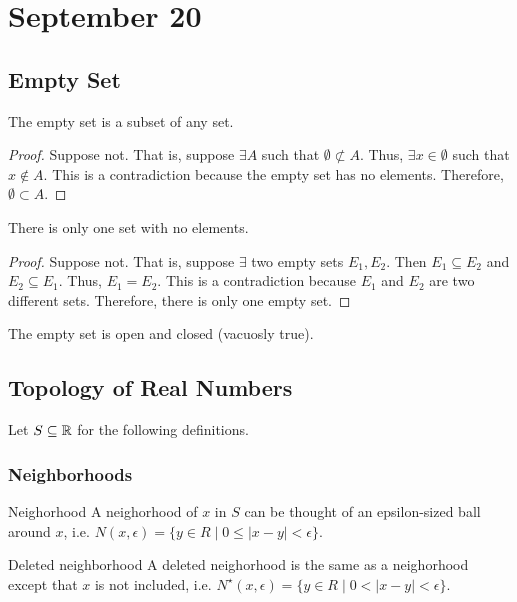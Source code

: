 \section{September 20}

\subsection{Empty Set}
\begin{theorem}{}{}
    The empty set is a subset of any set.
\end{theorem}
\begin{proof}
    Suppose not. That is, suppose $\exists A$ such that $\emptyset \not\subset A$. Thus, $\exists x \in \emptyset$ such that $x \not\in A$. This is a contradiction because the empty set has no elements. Therefore, $\emptyset \subset A$.
\end{proof}

\begin{theorem}{}{}
    There is only one set with no elements.
\end{theorem}
\begin{proof}
    Suppose not. That is, suppose $\exists$ two empty sets $E_1, E_2$. Then $E_1 \subseteq E_2$ and $E_2 \subseteq E_1$. Thus, $E_1 = E_2$. This is a contradiction because $E_1$ and $E_2$ are two different sets. Therefore, there is only one empty set.
\end{proof}
\begin{note}
    The empty set is open and closed (vacuosly true).
\end{note}

\subsection{Topology of Real Numbers}
Let $S \subseteq \mathbb{R}$ for the following definitions.

\subsubsection{Neighborhoods}
\begin{definition}{Neighorhood}{}
    A neighorhood of $x$ in $S$ can be thought of an epsilon-sized ball around $x$, i.e. $N(x, \epsilon) = \{ y \in R \mid 0 \leq |x - y| < \epsilon \}$.
\end{definition}
\begin{definition}{Deleted neighborhood}{}
    A deleted neighorhood is the same as a neighorhood except that $x$ is not included, i.e. $N^\star(x, \epsilon) = \{ y \in R \mid 0 < |x - y| < \epsilon \}$.
\end{definition}

